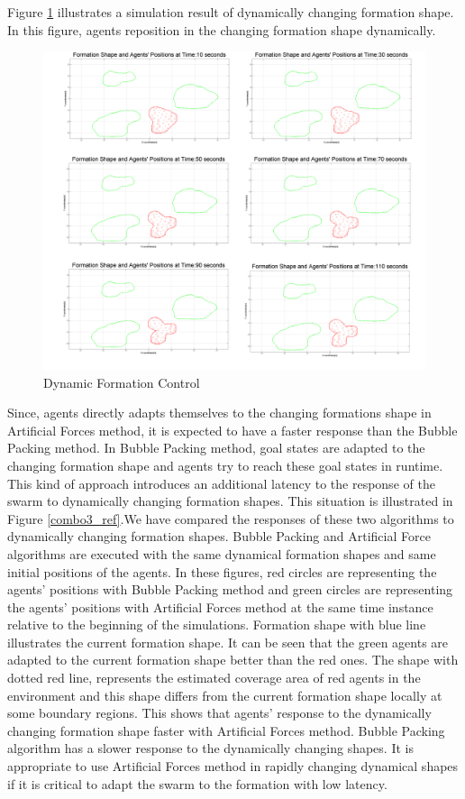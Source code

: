 \documentclass[letterpaper, 10 pt, conference]{ieeeconf}  %
\begin{document}
Figure \ref{multiple2_ref} illustrates a simulation result of dynamically changing formation shape. In this figure, agents reposition in the changing formation shape dynamically. 

\begin{figure}[thpb]
\caption{Dynamic Formation Control} \label{multiple2_ref}
\centerline{\includegraphics[scale = 0.08]{multiple2}}
\end{figure} 

Since, agents directly adapts themselves to the changing formations shape in Artificial Forces method, it is expected to have a faster response than the Bubble Packing method. In Bubble Packing method, goal states are adapted to the changing formation shape and agents try to reach these goal states in runtime. This kind of approach introduces an additional latency to the response of the swarm to dynamically changing formation shapes. This situation is illustrated in Figure \ref{combo3_ref}.We have compared the responses of these two algorithms to dynamically changing formation shapes. Bubble Packing and Artificial Force algorithms are executed with the same dynamical formation shapes and same initial positions of the agents. In these figures, red circles are representing the agents' positions with Bubble Packing method and green circles are representing the agents' positions with Artificial Forces method at the same time instance relative to the beginning of the simulations. Formation shape with blue line illustrates the current formation shape. It can be seen that the green agents are adapted to the current formation shape better than the red ones. The shape with dotted red line, represents the estimated coverage area of red agents in the environment and this shape differs from the current formation shape locally at some boundary regions. This shows that agents' response to the dynamically changing formation shape faster with Artificial Forces method. Bubble Packing algorithm has a slower response to the dynamically changing shapes. It is appropriate to use Artificial Forces method in rapidly changing dynamical shapes if it is critical to adapt the swarm to the formation with low latency.
\end{document}
